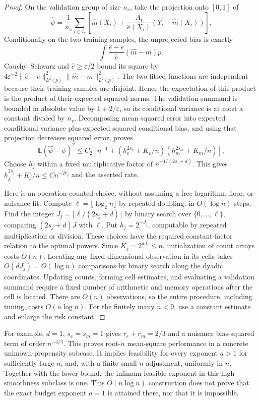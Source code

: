 \documentclass[11pt,a4paper]{article}
\newcommand{\E}{\mathbb E}
\theoremstyle{definition}
\begin{document}
\begin{proof}
On the validation group of size $n_v$, take the projection onto $[0,1]$ of
\[
 \widehat\psi=\frac1{n_v}\sum_{i\in I_v}
 \left[\widehat m(X_i)+\frac{A_i}{\widehat e(X_i)}
       (Y_i-\widehat m(X_i))\right].
\]
Conditionally on the two training samples, the unprojected bias is exactly
\[
 \int\frac{\widehat e-e}{\widehat e}(\widehat m-m)p.
\]
Cauchy--Schwarz and $\widehat e\ge\varepsilon/2$ bound its square by
$4\varepsilon^{-2}\|\widehat e-e\|_{L^2(p)}^2
\|\widehat m-m\|_{L^2(p)}^2$.
The two fitted functions are independent because their training samples are disjoint. Hence the expectation of this product is the product of their expected squared norms. The validation summand is bounded in absolute value by $1+2/\varepsilon$, so its conditional variance is at most a constant divided by $n_v$. Decomposing mean squared error into expected conditional variance plus expected squared conditional bias, and using that projection decreases squared error, proves
\[
 \E(\widehat\psi-\psi)^2
 \le C_2\left[n^{-1}
 +(h_e^{2s_e}+K_e/n)(h_m^{2s_m}+K_m/n)\right].
\]
Choose $h_j$ within a fixed multiplicative factor of $n^{-1/(2s_j+d)}$. This gives $h_j^{2s_j}+K_j/n\le Cn^{-2r_j}$ and the asserted rate.

Here is an operation-counted choice, without assuming a free logarithm, floor, or nuisance fit. Compute $\ell=\lfloor\log_2 n\rfloor$ by repeated doubling, in $O(\log n)$ steps. Find the integer
$J_j=\lfloor\ell/(2s_j+d)\rfloor$ by binary search over $\{0,\ldots,\ell\}$, comparing $(2s_j+d)J$ with $\ell$. Put $h_j=2^{-J_j}$, computable by repeated multiplication or division. These choices have the required constant-factor relation to the optimal powers. Since $K_j=2^{dJ_j}\le n$, initialization of count arrays costs $O(n)$. Locating any fixed-dimensional observation in its cells takes $O(dJ_j)=O(\log n)$ comparisons by binary search along the dyadic coordinates. Updating counts, forming cell estimates, and evaluating a validation summand require a fixed number of arithmetic and memory operations after the cell is located. There are $O(n)$ observations, so the entire procedure, including tuning, costs $O(n\log n)$. For the finitely many $n<9$, use a constant estimate and enlarge the risk constant.
\end{proof}

For example, $d=1$, $s_e=s_m=1$ gives $r_e+r_m=2/3$ and a nuisance bias-squared term of order $n^{-4/3}$. This proves root-$n$ mean-square performance in a concrete unknown-propensity subcase. It implies feasibility for every exponent $a>1$ for sufficiently large $n$, and, with a finite-small-$n$ adjustment, uniformly in $n$. Together with the lower bound, the infimum feasible exponent in this high-smoothness subclass is one. This $O(n\log n)$ construction does not prove that the exact budget exponent $a=1$ is attained there, nor that it is impossible.
\end{document}
